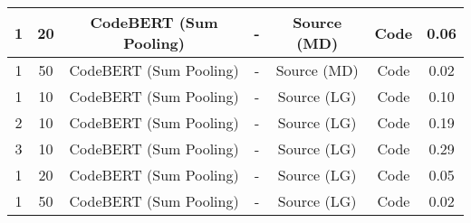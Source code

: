 \begin{longtable}{|c|c|c|c|c|c|c|}
\hline
1 & 20 & CodeBERT (Sum Pooling) & - & Source (MD) & Code & 0.06 \\
\hline
1 & 50 & CodeBERT (Sum Pooling) & - & Source (MD) & Code & 0.02 \\
\hline
1 & 10 & CodeBERT (Sum Pooling) & - & Source (LG) & Code & 0.10 \\
\hline
2 & 10 & CodeBERT (Sum Pooling) & - & Source (LG) & Code & 0.19 \\
\hline
3 & 10 & CodeBERT (Sum Pooling) & - & Source (LG) & Code & 0.29 \\
\hline
1 & 20 & CodeBERT (Sum Pooling) & - & Source (LG) & Code & 0.05 \\
\hline
1 & 50 & CodeBERT (Sum Pooling) & - & Source (LG) & Code & 0.02 \\
\hline
\end{longtable}

